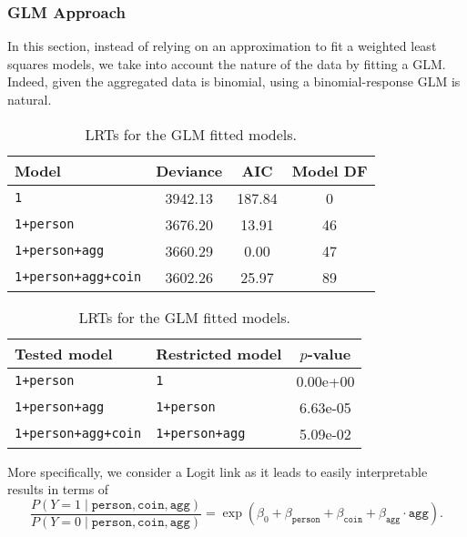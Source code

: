 \documentclass[a4paper, 12pt,oneside]{article}
\begin{document}
			\subsubsection{GLM Approach}
			In this section, instead of relying on an approximation to fit a weighted least squares models, we take into account the nature of the data by fitting a GLM. Indeed, given the aggregated data is binomial, using a binomial-response GLM is natural. 
			\begin{table}[htb]
				\centering
				\begin{subtable}{\textwidth}
					\centering
					\caption{Analysis of deviance of the GLM \texttt{1+person+agg+coin} model and AIC values.}
					\label{tab:glm-model-comparison}
					\begin{tabular}{lccc}
					\toprule
					Model & Deviance & AIC & Model DF \\
					\midrule
					\texttt{1} & 3942.13 & 187.84 & 0 \\
					\texttt{1+person} & 3676.20 & 13.91 & 46 \\
					\texttt{1+person+agg} & 3660.29 & 0.00 & 47 \\
					\texttt{1+person+agg+coin} & 3602.26 & 25.97 & 89 \\
					\bottomrule
					\end{tabular}
				\end{subtable}

				\begin{subtable}{\textwidth}
					\centering
					\caption{LRTs for the GLM fitted models.}
					\label{tab:glm-lrt-comparison}
					\begin{tabular}{llc}
					\toprule
					Tested model & Restricted model & $p$-value \\
					\midrule
					\texttt{1+person} & \texttt{1} & 0.00e+00 \\
					\texttt{1+person+agg} & \texttt{1+person} & 6.63e-05 \\
					\texttt{1+person+agg+coin} & \texttt{1+person+agg} & 5.09e-02 \\
					\bottomrule
					\end{tabular}
				\end{subtable}
			\end{table}

			More specifically, we consider a Logit link as it leads to easily interpretable results in terms of 
			\begin{equation}
				\label{eq:glm_model}
				\frac{P(Y=1\mid \texttt{person},\texttt{coin},\texttt{agg})}{P(Y=0\mid \texttt{person},\texttt{coin},\texttt{agg})} = 
				\exp(\beta_0 + \beta_{\texttt{person}}+\beta_{\texttt{coin}} +\beta_{\texttt{agg}}\cdot\texttt{agg}).
			\end{equation}
			
\end{document}
